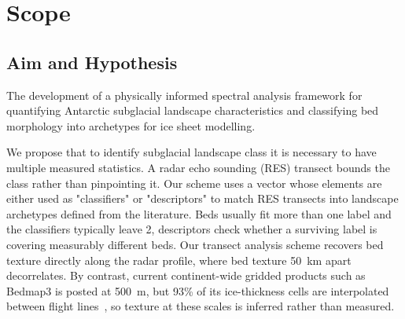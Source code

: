 \chapter{Scope}
\section{Aim and Hypothesis}
The development of a physically informed spectral analysis framework for quantifying Antarctic subglacial landscape characteristics and classifying bed morphology into archetypes for ice sheet modelling.

We propose that to identify subglacial landscape class it is necessary to have multiple measured statistics. A radar echo sounding (RES) transect bounds the class rather than pinpointing it. Our scheme uses a vector whose elements are either used as "classifiers" or "descriptors" to match RES transects into landscape archetypes defined from the literature. Beds usually fit more than one label and the classifiers typically leave 2, descriptors check whether a surviving label is covering measurably different beds. Our transect analysis scheme recovers bed texture directly along the radar profile, where bed texture 50~km apart decorrelates. By contrast, current continent-wide gridded products such as Bedmap3 is posted at 500~m, but 93\% of its ice-thickness cells are interpolated between flight lines~\cite{Pritchard_2025}, so texture at these scales is inferred rather than measured.

